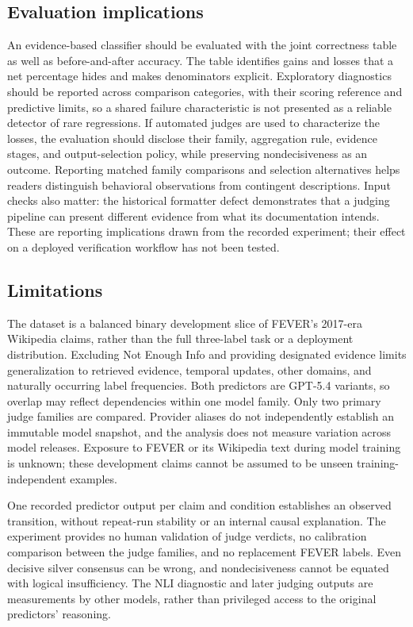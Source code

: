 \documentclass[11pt,letterpaper]{article}
\begin{document}
\subsection{Evaluation implications}
An evidence-based classifier should be evaluated with the joint correctness table as well as before-and-after accuracy. The table identifies gains and losses that a net percentage hides and makes denominators explicit. Exploratory diagnostics should be reported across comparison categories, with their scoring reference and predictive limits, so a shared failure characteristic is not presented as a reliable detector of rare regressions. If automated judges are used to characterize the losses, the evaluation should disclose their family, aggregation rule, evidence stages, and output-selection policy, while preserving nondecisiveness as an outcome. Reporting matched family comparisons and selection alternatives helps readers distinguish behavioral observations from contingent descriptions. Input checks also matter: the historical formatter defect demonstrates that a judging pipeline can present different evidence from what its documentation intends. These are reporting implications drawn from the recorded experiment; their effect on a deployed verification workflow has not been tested.

\subsection{Limitations}
The dataset is a balanced binary development slice of FEVER's 2017-era Wikipedia claims, rather than the full three-label task or a deployment distribution. Excluding Not Enough Info and providing designated evidence limits generalization to retrieved evidence, temporal updates, other domains, and naturally occurring label frequencies. Both predictors are GPT-5.4 variants, so overlap may reflect dependencies within one model family. Only two primary judge families are compared. Provider aliases do not independently establish an immutable model snapshot, and the analysis does not measure variation across model releases. Exposure to FEVER or its Wikipedia text during model training is unknown; these development claims cannot be assumed to be unseen training-independent examples.

One recorded predictor output per claim and condition establishes an observed transition, without repeat-run stability or an internal causal explanation. The experiment provides no human validation of judge verdicts, no calibration comparison between the judge families, and no replacement FEVER labels. Even decisive silver consensus can be wrong, and nondecisiveness cannot be equated with logical insufficiency. The NLI diagnostic and later judging outputs are measurements by other models, rather than privileged access to the original predictors' reasoning.
\end{document}
